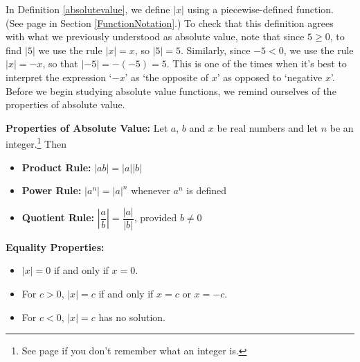\medskip

In Definition \ref{absolutevalue}, we define $|x|$ using a piecewise-defined function.  (See page \pageref{piecewisefunction} in Section \ref{FunctionNotation}.)  To check that this definition agrees with what we previously understood as absolute value, note that since $5 \geq 0$, to find $|5|$ we use the rule $|x| = x$, so $|5|=5$.  Similarly, since $-5 < 0$, we use the rule $|x| = -x$, so that $|-5| = -(-5) = 5$.  This is one of the times when it's best to interpret the expression `$-x$' as `the opposite of $x$' as opposed to `negative $x$'.  Before we begin studying absolute value functions, we remind ourselves of the properties of absolute value.

\medskip
\colorbox{ResultColor}{\bbm
\begin{thm}  \textbf{Properties of Absolute Value:} Let $a$, $b$ and $x$ be real numbers and let $n$ be an integer.\footnote{See page \pageref{setsofnumbersboxonthispage} if you don't remember what an integer is.}  Then \label{absolutevalueprops} 

\begin{itemize}

\item {\bf Product Rule:} $|ab|= |a||b|$ 

\item {\bf Power Rule:} $\left| a^{n} \right| = |a|^{n}$ whenever $a^{n}$ is defined 

\item {\bf Quotient Rule:} $\left| \dfrac{a}{b} \right| = \dfrac{|a|}{|b|}$, provided $b \neq 0$ 

\end{itemize}

{\bf Equality Properties:}

\begin{itemize}

\item  $|x| = 0$ if and only if $x = 0$.

\item  For $c > 0$, $|x| = c$ if and only if $x = c$ or $x = -c$.

\item  For $c < 0$, $|x| = c$ has no solution.

\end{itemize}

\end{thm}

\ebm}

